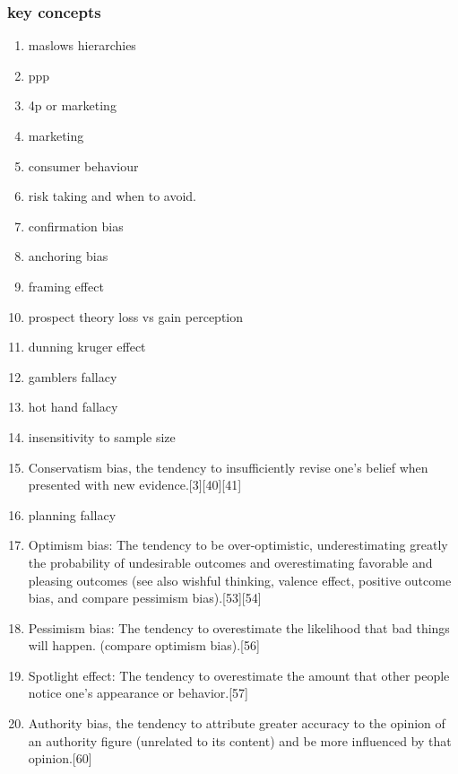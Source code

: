 \documentclass[11pt]{article}
\begin{document}
\subsubsection{key concepts}
\label{sec:org572f1d7}
\begin{enumerate}
\item maslows hierarchies
\label{sec:org0a91920}
\item ppp
\label{sec:org495a75f}
\item 4p or marketing
\label{sec:org9661948}
\item marketing
\label{sec:orgbea1a02}
\item consumer behaviour
\label{sec:orgd9a237d}
\item risk taking and when to avoid.
\label{sec:orged10738}
\item confirmation bias
\label{sec:org8663bf5}
\item anchoring bias
\label{sec:orgc9998ac}
\item framing effect
\label{sec:orgec5997a}
\item prospect theory loss vs gain perception
\label{sec:org1c7b9d1}
\item dunning kruger effect
\label{sec:orgf9789c7}
\item gamblers fallacy
\label{sec:orgd9fa076}
\item hot hand fallacy
\label{sec:org1962721}
\item insensitivity to sample size
\label{sec:org2472461}
\item Conservatism bias, the tendency to insufficiently revise one's belief when presented with new evidence.[3][40][41]
\label{sec:org4acf081}
\item planning fallacy
\label{sec:orgd01a134}
\item Optimism bias: The tendency to be over-optimistic, underestimating greatly the probability of undesirable outcomes and overestimating favorable and pleasing outcomes (see also wishful thinking, valence effect, positive outcome bias, and compare pessimism bias).[53][54]
\label{sec:org127f625}
\item Pessimism bias: The tendency to overestimate the likelihood that bad things will happen. (compare optimism bias).[56]
\label{sec:org1fd92fe}
\item Spotlight effect: The tendency to overestimate the amount that other people notice one's appearance or behavior.[57]
\label{sec:org2871fe3}
\item Authority bias, the tendency to attribute greater accuracy to the opinion of an authority figure (unrelated to its content) and be more influenced by that opinion.[60]

\end{enumerate}
\end{document}
